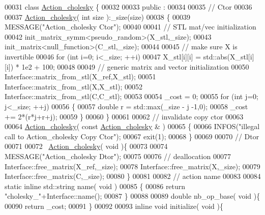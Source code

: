 \begin{DoxyCode}
00031 \textcolor{keyword}{class }\hyperlink{class_action__cholesky}{Action\_cholesky} \{
00032 
00033 public :
00034 
00035   \textcolor{comment}{// Ctor}
00036 
00037   \hyperlink{class_action__cholesky}{Action\_cholesky}( \textcolor{keywordtype}{int} size ):\_size(size)
00038   \{
00039     MESSAGE(\textcolor{stringliteral}{"Action\_cholesky Ctor"});
00040 
00041     \textcolor{comment}{// STL mat/vec initialization}
00042     init\_matrix\_symm<pseudo\_random>(X\_stl,\_size);
00043     init\_matrix<null\_function>(C\_stl,\_size);
00044 
00045     \textcolor{comment}{// make sure X is invertible}
00046     \textcolor{keywordflow}{for} (\textcolor{keywordtype}{int} i=0; i<\_size; ++i)
00047       X\_stl[i][i] = std::abs(X\_stl[i][i]) * 1e2 + 100;
00048 
00049     \textcolor{comment}{// generic matrix and vector initialization}
00050     Interface::matrix\_from\_stl(X\_ref,X\_stl);
00051     Interface::matrix\_from\_stl(X,X\_stl);
00052     Interface::matrix\_from\_stl(C,C\_stl);
00053 
00054     \_cost = 0;
00055     \textcolor{keywordflow}{for} (\textcolor{keywordtype}{int} j=0; j<\_size; ++j)
00056     \{
00057       \textcolor{keywordtype}{double} r = std::max(\_size - j -1,0);
00058       \_cost += 2*(r*j+r+j);
00059     \}
00060   \}
00061 
00062   \textcolor{comment}{// invalidate copy ctor}
00063 
00064   \hyperlink{class_action__cholesky}{Action\_cholesky}( \textcolor{keyword}{const}  \hyperlink{class_action__cholesky}{Action\_cholesky} & )
00065   \{
00066     INFOS(\textcolor{stringliteral}{"illegal call to Action\_cholesky Copy Ctor"});
00067     exit(1);
00068   \}
00069 
00070   \textcolor{comment}{// Dtor}
00071 
00072   ~\hyperlink{class_action__cholesky}{Action\_cholesky}( \textcolor{keywordtype}{void} )\{
00073 
00074     MESSAGE(\textcolor{stringliteral}{"Action\_cholesky Dtor"});
00075 
00076     \textcolor{comment}{// deallocation}
00077     Interface::free\_matrix(X\_ref,\_size);
00078     Interface::free\_matrix(X,\_size);
00079     Interface::free\_matrix(C,\_size);
00080   \}
00081 
00082   \textcolor{comment}{// action name}
00083 
00084   \textcolor{keyword}{static} \textcolor{keyword}{inline} std::string name( \textcolor{keywordtype}{void} )
00085   \{
00086     \textcolor{keywordflow}{return} \textcolor{stringliteral}{"cholesky\_"}+Interface::name();
00087   \}
00088 
00089   \textcolor{keywordtype}{double} nb\_op\_base( \textcolor{keywordtype}{void} )\{
00090     \textcolor{keywordflow}{return} \_cost;
00091   \}
00092 
00093   \textcolor{keyword}{inline} \textcolor{keywordtype}{void} initialize( \textcolor{keywordtype}{void} )\{

\end{DoxyCode}
